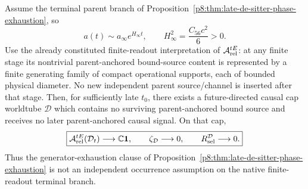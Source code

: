 \documentclass[12pt,a4paper]{article}
\begin{document}
\begin{theorem}
\label{p8:thm:v2112-terminal-causal-cap-occurrence}
Assume the terminal parent branch of
Proposition~\ref{p8:thm:late-de-sitter-phase-exhaustion}, so
\[
 a(t)\sim a_\infty e^{H_\infty t},
 \qquad
 H_\infty^2=\frac{C_{56}c^2}{6}>0.
\]
Use the already constituted finite-readout interpretation of
\(\mathcal A^{tE}_{\rm rel}\): at any finite stage its nontrivial
parent-anchored bound-source content is represented by a finite generating
family of compact operational supports, each of bounded physical diameter.
No new independent parent source/channel is inserted after that stage.
Then, for sufficiently late \(t_0\), there exists a future-directed causal
cap worldtube \(\mathcal D\) which contains no surviving parent-anchored bound
source and receives no later parent-anchored causal signal.  On that cap,
\begin{equation}
\label{p8:eq:v2112-causal-cap-algebra-collapse}
 \boxed{
 \mathcal A^{tE}_{\rm rel}(\mathcal D_t)
 \longrightarrow \mathbb C\mathbf 1,\qquad
 \zeta_{\mathcal D}\longrightarrow0,\qquad
 R_{\rm sel}^{\mathcal D}\longrightarrow0.}
\end{equation}
Thus the generator-exhaustion clause of
Proposition~\ref{p8:thm:late-de-sitter-phase-exhaustion} is not an independent
occurrence assumption on the native finite-readout terminal branch.
\end{theorem}
\end{document}
